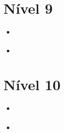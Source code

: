 \section{Nível 9}

\begin{itemize}
\item \url{}
\item \url{}
\end{itemize}



\section{Nível 10}

\begin{itemize}
\item \url{}
\item \url{}
\end{itemize}




